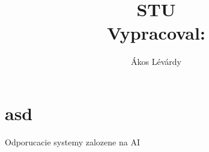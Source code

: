 \documentclass[10pt,oneside,slovak,a4paper]{article}
\title{\huge STU\\
\Large Vypracoval:\\}
\author{Ákos Lévárdy}
\begin{document}
\maketitle

\pagebreak

\tableofcontents

\pagebreak



\section{asd}
Odporucacie systemy zalozene na AI
\end{document}
